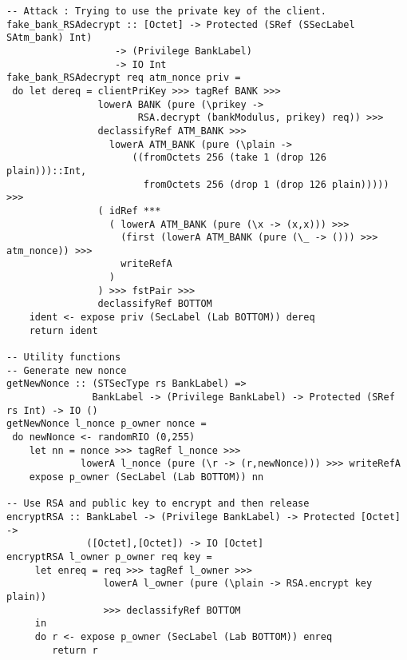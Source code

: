 \begin{Verbatim}[fontsize=\footnotesize,frame=lines,
                 framesep=5mm, label={[BankSystem.hs]BankSystem.hs}]
-- Attack : Trying to use the private key of the client.
fake_bank_RSAdecrypt :: [Octet] -> Protected (SRef (SSecLabel SAtm_bank) Int) 
                   -> (Privilege BankLabel)
                   -> IO Int
fake_bank_RSAdecrypt req atm_nonce priv = 
 do let dereq = clientPriKey >>> tagRef BANK >>>
                lowerA BANK (pure (\prikey -> 
                       RSA.decrypt (bankModulus, prikey) req)) >>>
                declassifyRef ATM_BANK >>>
                  lowerA ATM_BANK (pure (\plain -> 
                      ((fromOctets 256 (take 1 (drop 126 plain)))::Int,
                        fromOctets 256 (drop 1 (drop 126 plain))))) >>>
                ( idRef *** 
                  ( lowerA ATM_BANK (pure (\x -> (x,x))) >>>
                    (first (lowerA ATM_BANK (pure (\_ -> ())) >>> atm_nonce)) >>> 
                    writeRefA
                  )
                ) >>> fstPair >>> 
                declassifyRef BOTTOM
    ident <- expose priv (SecLabel (Lab BOTTOM)) dereq
    return ident

-- Utility functions 
-- Generate new nonce
getNewNonce :: (STSecType rs BankLabel) => 
               BankLabel -> (Privilege BankLabel) -> Protected (SRef rs Int) -> IO ()
getNewNonce l_nonce p_owner nonce =
 do newNonce <- randomRIO (0,255)
    let nn = nonce >>> tagRef l_nonce >>> 
             lowerA l_nonce (pure (\r -> (r,newNonce))) >>> writeRefA 
    expose p_owner (SecLabel (Lab BOTTOM)) nn

-- Use RSA and public key to encrypt and then release
encryptRSA :: BankLabel -> (Privilege BankLabel) -> Protected [Octet] -> 
              ([Octet],[Octet]) -> IO [Octet]
encryptRSA l_owner p_owner req key =
     let enreq = req >>> tagRef l_owner >>> 
                 lowerA l_owner (pure (\plain -> RSA.encrypt key plain))
                 >>> declassifyRef BOTTOM
     in
     do r <- expose p_owner (SecLabel (Lab BOTTOM)) enreq
        return r
\end{Verbatim}
